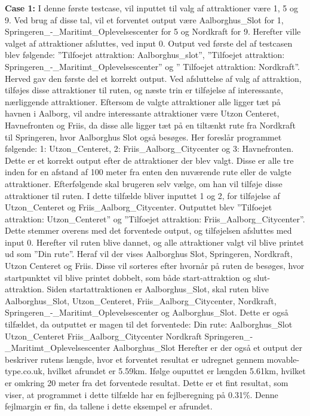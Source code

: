 \textbf{Case 1:} \newline
I denne første testcase, vil inputtet til valg af attraktioner være 1, 5 og 9. Ved brug af disse tal, vil et forventet output være Aalborghus\_Slot for 1, Springeren\_-\_Maritimt\_Oplevelsescenter for 5 og Nordkraft for 9. Herefter ville valget af attraktioner afsluttes, ved input 0.
Output ved første del af testcasen blev følgende: ”Tilfoejet attraktion: Aalborghus\_slot”, ”Tilfoejet attraktion: Springeren\_-\_Maritimt\_Oplevelsescenter” og ” Tilfoejet attraktion: Nordkraft”. Herved gav den første del et korrekt output. Ved afsluttelse af valg af attraktion, tilføjes disse attraktioner til ruten, og næste trin er tilføjelse af interessante, nærliggende attraktioner. Eftersom de valgte attraktioner alle ligger tæt på havnen i Aalborg, vil andre interessante attraktioner være Utzon Centeret, Havnefronten og Friis, da disse alle ligger tæt på en tiltænkt rute fra Nordkraft til Springeren, hvor Aalborghus Slot også besøges.\newline
Her foreslår programmet følgende: 1: Utzon\_Centeret, 2: Friis\_Aalborg\_Citycenter og 3: Havnefronten. Dette er et korrekt output efter de attraktioner der blev valgt. Disse er alle tre inden for en afstand af 100 meter fra enten den nuværende rute eller de valgte attraktioner. Efterfølgende skal brugeren selv vælge, om han vil tilføje disse attraktioner til ruten. I dette tilfælde bliver inputtet 1 og 2, for tilføjelse af Utzon\_Centeret og Friis\_Aalborg\_Citycenter. Outputtet blev ”Tilfoejet attraktion: Utzon\_Centeret” og ”Tilfoejet attraktion: Friis\_Aalborg\_Citycenter”. Dette stemmer overens med det forventede output, og tilføjelsen afsluttes med input 0. Herefter vil ruten blive dannet, og alle attraktioner valgt vil blive printet ud som ”Din rute”. Heraf vil der vises Aalborghus Slot, Springeren, Nordkraft, Utzon Centeret og Friis. Disse vil sorteres efter hvornår på ruten de besøges, hvor startpunktet vil blive printet dobbelt, som både start-attraktion og slut-attraktion. Siden startattraktionen er Aalborghus\_Slot, skal ruten blive Aalborghus\_Slot, Utzon\_Centeret, Friis\_Aalborg\_Citycenter, Nordkraft, Springeren\_-\_Maritimt\_Oplevelsescenter og Aalborghus\_Slot. Dette er også tilfældet, da outputtet er magen til det forventede:\newline
Din rute:\newline
Aalborghus\_Slot\newline
Utzon\_Centeret\newline
Friis\_Aalborg\_Citycenter\newline
Nordkraft\newline
Springeren\_-\_Maritimt\_Oplevelsescenter\newline
Aalborghus\_Slot\newline
Herefter er der også et output der beskriver rutens længde, hvor et forventet resultat er udregnet gennem movable-type.co.uk, hvilket afrundet er 5.59km. Ifølge ouputtet er længden 5.61km, hvilket er omkring 20 meter fra det forventede resultat. Dette er et fint resultat, som viser, at programmet i dette tilfælde har en fejlberegning på 0.31\%. Denne fejlmargin er fin, da tallene i dette eksempel er afrundet.

